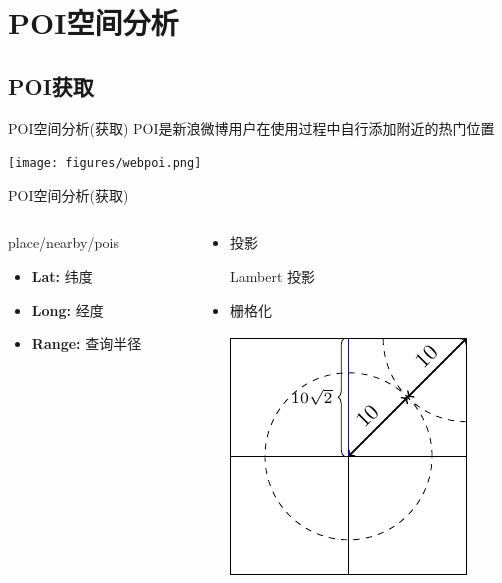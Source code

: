 \section{POI空间分析}

\subsection{POI获取}

\begin{frame}[c]{POI空间分析(获取)}
    POI是新浪微博用户在使用过程中自行添加附近的热门位置

    \vspace{1em}
    \texttt{[image: figures/webpoi.png]}
\end{frame}

\begin{frame}[c]{POI空间分析(获取)}
    \begin{columns}
        \begin{column}{0.5 \textwidth}
            \alert{place/nearby/pois}
            \vspace{1em}
            \begin{itemize}
                \item \textbf{Lat:} 纬度
                \item \textbf{Long:} 经度
                \item \textbf{Range:} 查询半径
            \end{itemize}
        \end{column}
        
        \pause
        \begin{column}{0.5 \textwidth}
            \begin{itemize}
                \item \alert{投影}

                Lambert 投影

                \pause
                \item \alert{栅格化}

                \vspace{0.5em}
                \includegraphics[scale=0.8]{figures/query.pdf}


\end{itemize}
\end{column}
\end{columns}
\end{frame}
